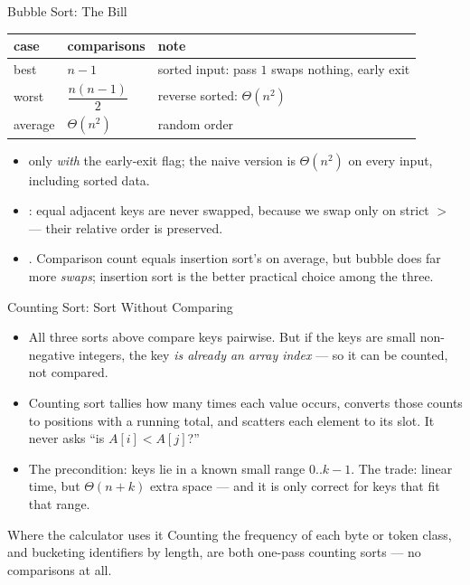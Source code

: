 \documentclass[aspectratio=169]{beamer}
\begin{document}
\begin{frame}{Bubble Sort: The Bill}
  \begin{center}
  {\footnotesize
  \begin{tabular}{lll}
    \toprule
    \textbf{case} & \textbf{comparisons} & \textbf{note} \\
    \midrule
    best & $n-1$ & sorted input: pass $1$ swaps nothing, early exit \\
    worst & $\dfrac{n(n-1)}{2}$ & reverse sorted: $\Theta(n^2)$ \\
    average & $\Theta(n^2)$ & random order \\
    \bottomrule
  \end{tabular}}
  \end{center}
  \begin{itemize}
    \item {} only \emph{with} the early-exit flag; the naive
      version is $\Theta(n^2)$ on every input, including sorted data.
    \item {}: equal adjacent keys are never swapped, because we
      swap only on strict $>$ --- their relative order is preserved.
    \item {}. Comparison count equals insertion sort's on
      average, but bubble does far more \emph{swaps}; insertion sort is the
      better practical choice among the three.
  \end{itemize}
\end{frame}

\begin{frame}{Counting Sort: Sort Without Comparing}
  \begin{itemize}
    \item All three sorts above compare keys pairwise. But if the keys are
      small non-negative integers, the key \emph{is already an array index} ---
      so it can be counted, not compared.
    \item Counting sort tallies how many times each value occurs, converts
      those counts to positions with a running total, and scatters each
      element to its slot. It never asks ``is $A[i] < A[j]$?''
    \item The precondition: keys lie in a known small range $0..k-1$. The
      trade: linear time, but $\Theta(n + k)$ extra space --- and it is only
      correct for keys that fit that range.
  \end{itemize}
  \begin{exampleblock}{Where the calculator uses it}
    Counting the frequency of each byte or token class, and bucketing
    identifiers by length, are both one-pass counting sorts --- no
    comparisons at all.
  \end{exampleblock}
\end{frame}
\end{document}

